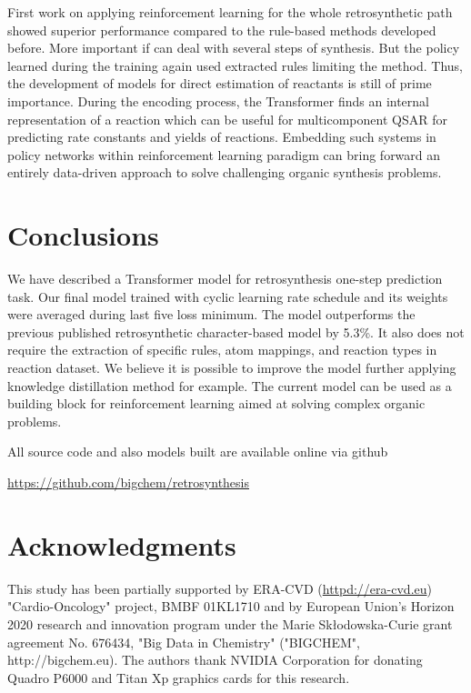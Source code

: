\documentclass{article}
\begin{document}
First work on applying reinforcement learning for the whole retrosynthetic path \cite{Preuss} showed superior performance compared to the rule-based methods developed before. More important if can deal with several steps of synthesis. But the policy learned during the training again used extracted rules limiting the method. Thus, the development of models for direct estimation of reactants is still of prime importance. During the encoding process, the Transformer finds an internal representation of a reaction which can be useful for multicomponent QSAR \cite{Kravtsov}  for predicting rate constants \cite{Varnek} and yields of reactions. Embedding such systems in policy networks within reinforcement learning paradigm can bring forward an entirely data-driven approach to solve challenging organic synthesis problems.

\section{Conclusions}

We have described a Transformer model for retrosynthesis one-step prediction task. Our final model trained with cyclic learning rate schedule and its weights were averaged during last five loss minimum. The model outperforms the previous published retrosynthetic character-based model by 5.3\%. It also does not require the extraction of specific rules, atom mappings, and reaction types in reaction dataset. We believe it is possible to improve the model further applying knowledge distillation method \cite{Hinton} for example. The current model can be used as a building block for reinforcement learning aimed at solving complex organic problems.

All source code and also models built are available online via github
\begin{center}
  \url{https://github.com/bigchem/retrosynthesis}
\end{center}

\section*{Acknowledgments}
This study has been partially supported by ERA-CVD (\url{httpd://era-cvd.eu}) "Cardio-Oncology" project, BMBF 01KL1710 and 
by European Union's Horizon 2020 research and innovation program under the Marie Sk\l odowska-Curie grant agreement No. 676434, "Big Data in Chemistry" ("BIGCHEM", http://bigchem.eu). 
The authors thank NVIDIA Corporation for donating Quadro P6000 and Titan Xp graphics cards for this research.
\end{document}
